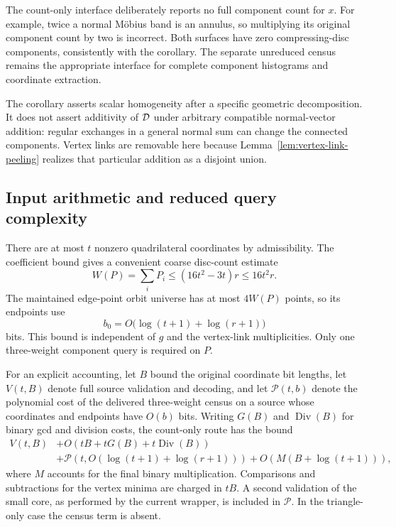 The count-only interface deliberately reports no full component count for
$x$. For example, twice a normal M\"obius band is an annulus, so multiplying
its original component count by two is incorrect. Both surfaces have zero
compressing-disc components, consistently with the corollary. The separate
unreduced census remains the appropriate interface for complete component
histograms and coordinate extraction.

The corollary asserts scalar homogeneity after a specific geometric
decomposition. It does not assert additivity of $\mathcal D$ under arbitrary
compatible normal-vector addition: regular exchanges in a general normal
sum can change the connected components. Vertex links are removable here
because Lemma~\ref{lem:vertex-link-peeling} realizes that particular addition
as a disjoint union.

\subsection{Input arithmetic and reduced query complexity}

There are at most $t$ nonzero quadrilateral coordinates by admissibility.
The coefficient bound gives a convenient coarse disc-count estimate
\[
 W(P)=\sum_iP_i\le(16t^2-3t)r\le16t^2r.
\]
The maintained edge-point orbit universe has at most $4W(P)$ points, so its
endpoints use
\[
 b_0=O\bigl(\log(t+1)+\log(r+1)\bigr)
\]
bits. This bound is independent of $g$ and the vertex-link multiplicities.
Only one three-weight component query is required on $P$.

For an explicit accounting, let $B$ bound the original coordinate bit
lengths, let $V(t,B)$ denote full source validation and decoding, and let
$\mathcal P(t,b)$ denote the polynomial cost of the delivered three-weight
census on a source whose coordinates and endpoints have $O(b)$ bits.
Writing $G(B)$ and $\operatorname{Div}(B)$ for binary gcd and division costs,
the count-only route has the bound
\[
\begin{split}
 V(t,B)&+O\!\left(tB+tG(B)+t\operatorname{Div}(B)\right)\\
 &+\mathcal P\!\left(t,O(\log(t+1)+\log(r+1))\right)
 +O\!\left(M(B+\log(t+1))\right),
\end{split}
\]
where $M$ accounts for the final binary multiplication. Comparisons and
subtractions for the vertex minima are charged in $tB$. A second validation
of the small core, as performed by the current wrapper, is included in
$\mathcal P$. In the triangle-only case the census term is absent.

